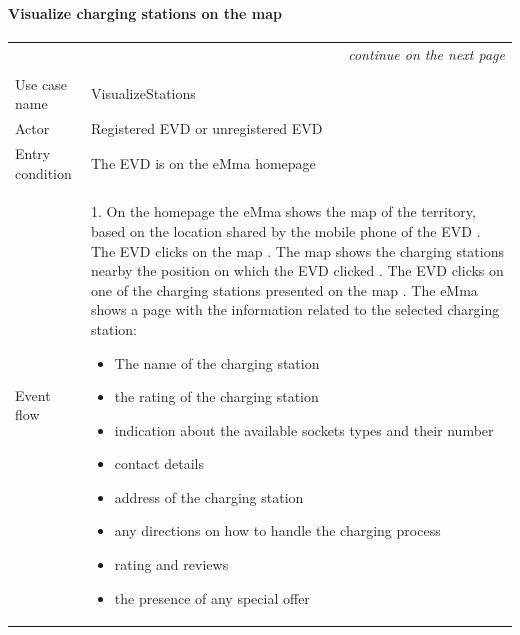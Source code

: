 \paragraph{Visualize charging stations on the map}
\begin{center}
    \begin{longtable}{p{4cm} p{11cm}}
    \multicolumn{2}{r}{\itshape{continue on the next page}}\\
    \endfoot 
    \\
    \endlastfoot
    \hline
     Use case name &  VisualizeStations\\
     \hline
     Actor & Registered EVD or unregistered EVD \\
     \hline
     Entry condition & The EVD is on the eMma homepage \\
     \hline
     Event flow &   1. On the homepage the eMma shows the map of the territory, based on the location shared by the mobile phone of the EVD \newline
                    2. The EVD clicks on the map \newline
                    3. The map shows the charging stations nearby the position on which the EVD clicked \newline
                    4. The EVD clicks on one of the charging stations presented on the map \newline
                    5. The eMma shows a page with the information related to the selected charging station:
                    \begin{adjustwidth}{0.5cm}{}
                        \begin{itemize}
                                \item The name of the charging station
                                \item the rating of the charging station
                                \item indication about the available sockets types and their number
                                \item contact details
                                \item address of the charging station
                                \item any directions on how to handle the charging process
                                \item rating and reviews
                                \item the presence of any special offer

\end{itemize}
\end{adjustwidth}
\end{longtable}
\end{center}
